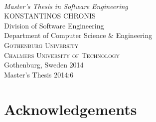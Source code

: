 \begin{titlepage}

\mbox{}
\vfill
\addtolength{\voffset}{2cm}
\begin{flushleft}
	{ \\[0.5cm]
	\emph{\Large Master's Thesis in Software Engineering} \\[.8cm]
	
	{\huge KONSTANTINOS CHRONIS}\\[.8cm]
	
	{\Large Division of Software Engineering \\
	Department of Computer Science \& Engineering \\
	\textsc{Gothenburg University} \\
	\textsc{Chalmers University of Technology} \\
	Gothenburg, Sweden 2014 \\
	Master's Thesis 2014:6\\
	} 
	}
\end{flushleft}

\end{titlepage}
\ClearShipoutPicture

\pagestyle{empty}
\newpage
\clearpage
\mbox{}
\newpage
\clearpage
\thispagestyle{empty}

\begin{abstract}

\end{abstract}

\newpage
\clearpage
\mbox{}
\newpage
\clearpage
\thispagestyle{empty}
\section*{Acknowledgements}

\newpage
\clearpage
\mbox{}
